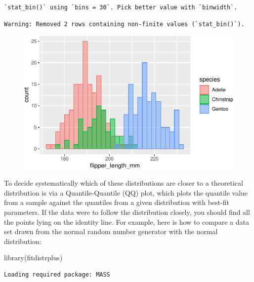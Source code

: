 \documentclass[
  letterpaper,
  DIV=11,
  numbers=noendperiod]{scrreprt}
\newenvironment{Shaded}{\begin{snugshade}}{\end{snugshade}}
\newcommand{\FunctionTok}[1]{\textcolor[rgb]{0.28,0.35,0.67}{#1}}
\newcommand{\NormalTok}[1]{\textcolor[rgb]{0.00,0.23,0.31}{#1}}
\begin{document}
\begin{verbatim}
`stat_bin()` using `bins = 30`. Pick better value with `binwidth`.
\end{verbatim}

\begin{verbatim}
Warning: Removed 2 rows containing non-finite values (`stat_bin()`).
\end{verbatim}

\begin{figure}[H]

{\centering \includegraphics{./04-distributions_files/figure-pdf/unnamed-chunk-19-1.pdf}

}

\end{figure}

To decide systematically which of these distributions are closer to a
theoretical distribution is via a Quantile-Quantile (QQ) plot, which
plots the quantile value from a sample against the quantiles from a
given distribution with best-fit parameters. If the data were to follow
the distribution closely, you should find all the points lying on the
identity line. For example, here is how to compare a data set drawn from
the normal random number generator with the normal distribution:

\begin{Shaded}
\begin{Highlighting}[]
\FunctionTok{library}\NormalTok{(fitdistrplus)}
\end{Highlighting}
\end{Shaded}

\begin{verbatim}
Loading required package: MASS
\end{verbatim}
\end{document}
